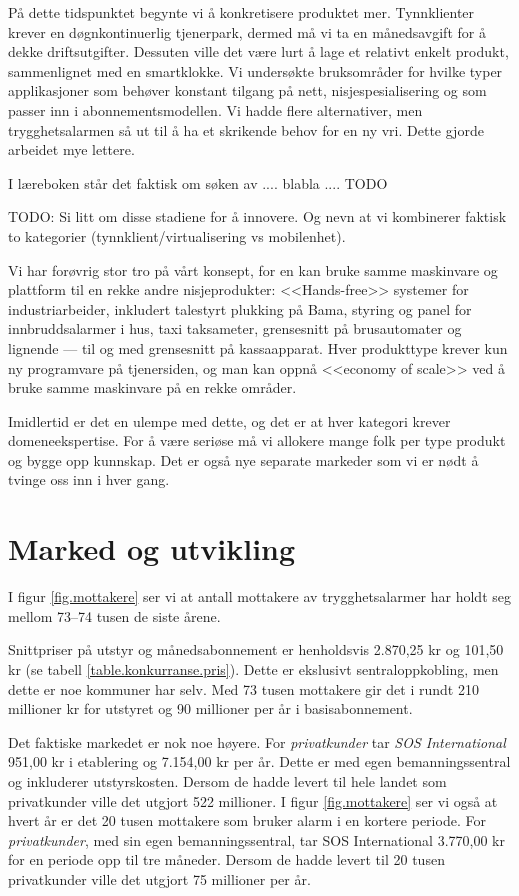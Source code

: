På dette tidspunktet begynte vi å konkretisere produktet mer. Tynnklienter
krever en døgnkontinuerlig tjenerpark, dermed må vi ta en månedsavgift for å
dekke driftsutgifter. Dessuten ville det være lurt å lage et relativt enkelt
produkt, sammenlignet med en smartklokke. Vi undersøkte bruksområder for hvilke
typer applikasjoner som behøver konstant tilgang på nett, nisjespesialisering og som passer inn i
abonnementsmodellen. Vi hadde flere alternativer, men trygghetsalarmen så ut
til å ha et skrikende behov for en ny vri. Dette gjorde arbeidet mye lettere.

I læreboken står det faktisk om søken av .... blabla .... TODO

TODO: Si litt om disse stadiene for å innovere. Og nevn at vi kombinerer
faktisk to kategorier (tynnklient/virtualisering vs mobilenhet).

Vi har forøvrig stor tro på vårt konsept, for en kan bruke samme maskinvare og
plattform til en rekke andre nisjeprodukter: <<Hands-free>> systemer for
industriarbeider, inkludert talestyrt plukking på Bama, styring og panel for
innbruddsalarmer i hus, taxi taksameter, grensesnitt på brusautomater og
lignende --- til og med grensesnitt på kassaapparat.  Hver produkttype krever
kun ny programvare på tjenersiden, og man kan oppnå <<economy of scale>> ved å
bruke samme maskinvare på en rekke områder.

Imidlertid er det en ulempe med dette, og det er at hver kategori krever
domeneekspertise. For å være seriøse må vi allokere mange folk per type produkt
og bygge opp kunnskap. Det er også nye separate markeder som vi er nødt å
tvinge oss inn i hver gang.


\section{Marked og utvikling}

I figur \vref{fig.mottakere} ser vi at antall mottakere av trygghetsalarmer har
holdt seg mellom 73--74 tusen de siste årene.  

Snittpriser på utstyr og månedsabonnement er henholdsvis 2.870,25 kr og 101,50
kr (se tabell \vref{table.konkurranse.pris}). Dette er ekslusivt
sentraloppkobling, men dette er noe kommuner har selv. Med 73 tusen mottakere
gir det i rundt 210 millioner kr for utstyret og 90 millioner per år i
basisabonnement. 

Det faktiske markedet er nok noe høyere. For \textit{privatkunder} tar
\textit{SOS International} 951,00 kr i etablering og 7.154,00 kr per år. Dette
er med egen bemanningssentral og inkluderer utstyrskosten. Dersom de hadde
levert til hele landet som privatkunder ville det utgjort 522 millioner.  I
figur \vref{fig.mottakere} ser vi også at hvert år er det 20 tusen mottakere
som bruker alarm i en kortere periode. For \textit{privatkunder}, med sin egen
bemanningssentral, tar SOS International 3.770,00 kr for en periode opp til tre
måneder.  Dersom de hadde levert til 20 tusen privatkunder ville det utgjort 75
millioner per år.

